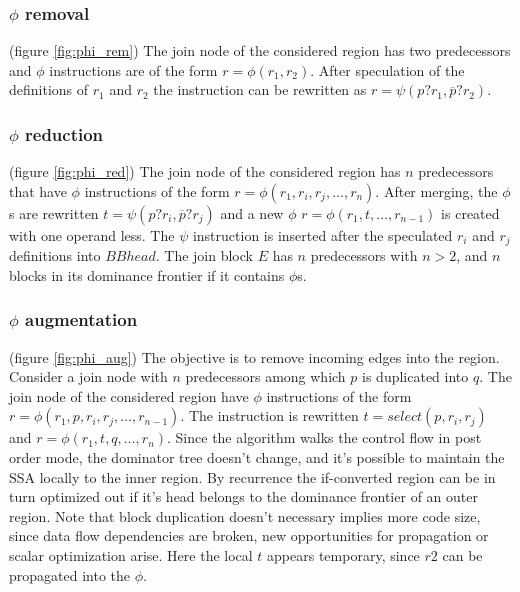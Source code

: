 \subsubsection{$\phi$ removal} (figure \ref{fig:phi_rem})
The join node of the considered region has two predecessors and $\phi$ instructions are of the form $r=\phi(r_1,r_2)$. After speculation of the definitions of $r_1$ and $r_2$ the instruction can be rewritten as $r=\psi(p?r_1,\overline{p}?r_2)$.
\subsubsection{$\phi$ reduction} (figure \ref{fig:phi_red})
 The join node of the considered region has $n$ predecessors that have $\phi$ instructions of the form $r=\phi(r_1,r_i,r_j,\dots,r_n)$. After merging, the $\phi$s are rewritten $t=\psi(p?r_i,\overline{p}?r_j)$ and a new $\phi$ $r=\phi(r_1,t,\dots,r_{n-1})$ is created with one operand less. The $\psi$ instruction is inserted after the speculated $r_i$ and $r_j$ definitions into $BBhead$.
The join block $E$ has $n$ predecessors with $n > 2$, and $n$ blocks in its dominance frontier if it contains $\phi$s.
\subsubsection{$\phi$ augmentation} (figure \ref{fig:phi_aug})
The objective is to remove incoming edges into the region. 
Consider a join node with $n$ predecessors among which $p$ is duplicated into $q$.  The join node of the considered region have $\phi$ instructions of the form $r=\phi(r_1,p,r_i,r_j,\dots,r_{n-1})$. The instruction is rewritten $t=select(p,r_i,r_j)$ and \mbox{$r=\phi(r_1,t,q,\dots,r_n)$}. 
Since the algorithm walks the control flow in post order mode, the dominator tree doesn't change, and it's possible to maintain the SSA locally to the inner region. By recurrence the if-converted region can be in turn optimized out if it's head belongs to the dominance frontier of an outer region.
Note that block duplication doesn't necessary implies more code size, since data flow dependencies are broken, new opportunities for propagation or scalar optimization arise. Here the local $t$ appears temporary, since $r2$ can be propagated into the $\phi$.

